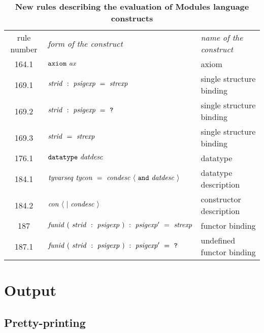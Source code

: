 \begin{longtable}{cll%
}
\caption%
{\bf  New rules describing the evaluation of Modules language constructs\label{tab:new-eval-mod}}\\
 rule number & \sl form of the construct & \sl name of the construct %
\\%
164.1 & $\AXIOM\ \axiombind$   & axiom %
\\
169.1 & $\strid\ :\ \psigexp\ =\ \strexp$  & single structure binding %
\\
169.2 & $\strid\ : \ \psigexp\ =\ \qmark$  & single structure binding %
\\
169.3 & $\strid\ =\ \strexp$  & single structure binding %
\\
176.1 & $\DATATYPE\ \datdesc$ & datatype \\
184.1 & $\tyvarseq\ \tycon\ =\ \condesc\ \langle\ \AND\ \datdesc\ \rangle$ & datatype description \\
184.2 & $\con\ \langle \ | \ \condesc\ \rangle$ & constructor description \\
187   & $\funid\ (\ \strid\ :\ \psigexp\ )\ :\ \psigexp'\ =\ \strexp$ & functor binding %
\\
187.1 & $\funid\ (\ \strid\ :\ \psigexp\ )\ :\ \psigexp'\ =\ \qmark$ & undefined functor binding %
\\
\end{longtable}

\section{Output}

\subsection{Pretty-printing}

